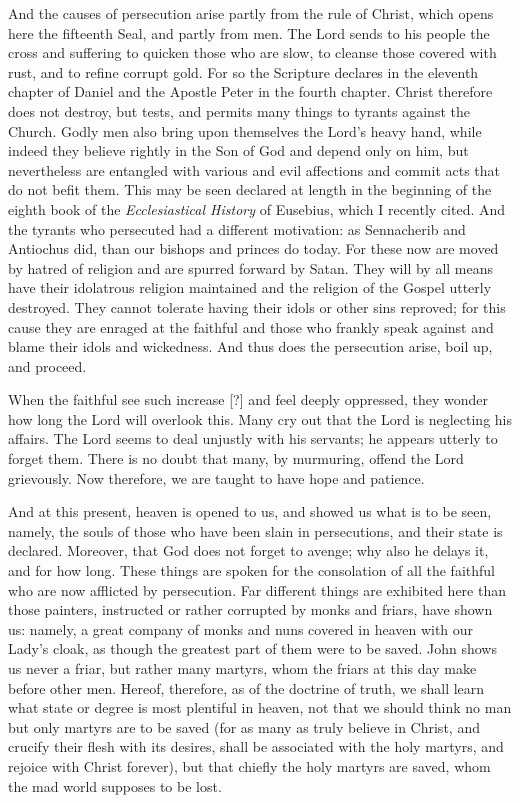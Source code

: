And the causes of persecution arise partly from the rule of Christ, which opens here the fifteenth Seal, and partly from men. The Lord sends to his people the cross and suffering to quicken those who are slow, to cleanse those covered with rust, and to refine corrupt gold. For so the Scripture declares in the eleventh chapter of Daniel and the Apostle Peter in the fourth chapter. Christ therefore does not destroy, but tests, and permits many things to tyrants against the Church. Godly men also bring upon themselves the Lord’s heavy hand, while indeed they believe rightly in the Son of God and depend only on him, but nevertheless are entangled with various and evil affections and commit acts that do not befit them. This may be seen declared at length in the beginning of the eighth book of the \textit{Ecclesiastical History} of Eusebius, which I recently cited. And the tyrants who persecuted had a different motivation: as Sennacherib and Antiochus did, than our bishops and princes do today. For these now are moved by hatred of religion and are spurred forward by Satan. They will by all means have their idolatrous religion maintained and the religion of the Gospel utterly destroyed. They cannot tolerate having their idols or other sins reproved; for this cause they are enraged at the faithful and those who frankly speak against and blame their idols and wickedness. And thus does the persecution arise, boil up, and proceed.

When the faithful see such increase [?] and feel deeply oppressed, they wonder how long the Lord will overlook this. Many cry out that the Lord is neglecting his affairs. The Lord seems to deal unjustly with his servants; he appears utterly to forget them. There is no doubt that many, by murmuring, offend the Lord grievously. Now therefore, we are taught to have hope and patience.

And at this present, heaven is opened to us, and showed us what is to be seen, namely, the souls of those who have been slain in persecutions, and their state is declared. Moreover, that God does not forget to avenge; why also he delays it, and for how long. These things are spoken for the consolation of all the faithful who are now afflicted by persecution. Far different things are exhibited here than those painters, instructed or rather corrupted by monks and friars, have shown us: namely, a great company of monks and nuns covered in heaven with our Lady’s cloak, as though the greatest part of them were to be saved. John shows us never a friar, but rather many martyrs, whom the friars at this day make before other men. Hereof, therefore, as of the doctrine of truth, we shall learn what state or degree is most plentiful in heaven, not that we should think no man but only martyrs are to be saved (for as many as truly believe in Christ, and crucify their flesh with its desires, shall be associated with the holy martyrs, and rejoice with Christ forever), but that chiefly the holy martyrs are saved, whom the mad world supposes to be lost.

